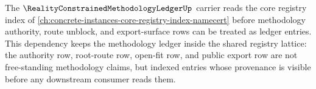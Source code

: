 The $\RealityConstrainedMethodologyLedgerUp$ carrier reads the core registry index of \autoref{ch:concrete-instances-core-registry-index-namecert} before methodology authority, route unblock, and export-surface rows can be treated as ledger entries. This dependency keeps the methodology ledger inside the shared registry lattice: the authority row, root-route row, open-fit row, and public export row are not free-standing methodology claims, but indexed entries whose provenance is visible before any downstream consumer reads them.
